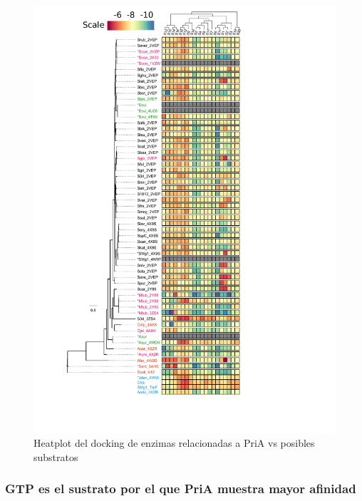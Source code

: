 \documentclass[]{article}
\begin{document}
{\begin{figure}[h!tbp]
\centering
\includegraphics[angle = 0,scale = .7]{chapter4/Figura1_4.pdf}
\caption[Heatplot del docking de enzimas relacionadas a PriA vs posibles substratos]{\footnotesize{Heatplot del docking de enzimas relacionadas a PriA vs posibles substratos}}
\label{fig:HeatplodPriAdocking}
\end{figure}

\subsubsection{GTP es el sustrato por el que PriA muestra mayor
afinidad}\label{gtp-es-el-sustrato-por-el-que-pria-muestra-mayor-afinidad}

}
\end{document}
